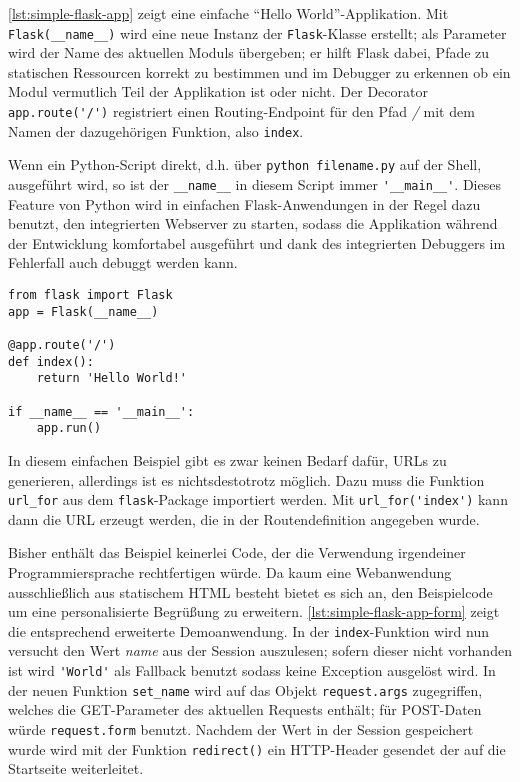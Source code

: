 \autoref{lst:simple-flask-app} zeigt eine einfache \enquote{Hello World}-Applikation. Mit
\lstinline{Flask(__name__)} wird eine neue Instanz der \lstinline{Flask}-Klasse erstellt; als
Parameter wird der Name des aktuellen Moduls übergeben; er hilft Flask dabei, Pfade zu statischen
Ressourcen korrekt zu bestimmen und im Debugger zu erkennen ob ein Modul vermutlich Teil der
Applikation ist oder nicht. Der Decorator \lstinline{app.route('/')} registriert einen
Routing-Endpoint für den Pfad \emph{/} mit dem Namen der dazugehörigen Funktion, also
\lstinline{index}.

Wenn ein Python-Script direkt, d.h. über \lstinline{python filename.py} auf der Shell, ausgeführt
wird, so ist der \lstinline{__name__} in diesem Script immer \lstinline{'__main__'}. Dieses Feature
von Python wird in einfachen Flask-Anwendungen in der Regel dazu benutzt, den integrierten Webserver
zu starten, sodass die Applikation während der Entwicklung komfortabel ausgeführt und dank des
integrierten Debuggers im Fehlerfall auch debuggt werden kann.

\begin{lstlisting}[caption=Hello World mit Flask,label=lst:simple-flask-app]
from flask import Flask
app = Flask(__name__)

@app.route('/')
def index():
    return 'Hello World!'

if __name__ == '__main__':
    app.run()
\end{lstlisting}

In diesem einfachen Beispiel gibt es zwar keinen Bedarf dafür, URLs zu generieren, allerdings ist es
nichtsdestotrotz möglich. Dazu muss die Funktion \lstinline{url_for} aus dem
\lstinline{flask}-Package importiert werden. Mit \lstinline{url_for('index')} kann dann die URL
erzeugt werden, die in der Routendefinition angegeben wurde.

Bisher enthält das Beispiel keinerlei Code, der die Verwendung irgendeiner Programmiersprache
rechtfertigen würde. Da kaum eine Webanwendung ausschließlich aus statischem HTML besteht bietet es
sich an, den Beispielcode um eine personalisierte Begrüßung zu erweitern.
\autoref{lst:simple-flask-app-form} zeigt die entsprechend erweiterte Demoanwendung. In der
\lstinline{index}-Funktion wird nun versucht den Wert \emph{name} aus der Session auszulesen; sofern
dieser nicht vorhanden ist wird \lstinline{'World'} als Fallback benutzt sodass keine Exception
ausgelöst wird. In der neuen Funktion \lstinline{set_name} wird auf das Objekt
\lstinline{request.args} zugegriffen, welches die GET-Parameter des aktuellen Requests enthält; für
POST-Daten würde \lstinline{request.form} benutzt. Nachdem der Wert in der Session gespeichert wurde
wird mit der Funktion \lstinline{redirect()} ein HTTP-Header gesendet der auf die Startseite
weiterleitet.


